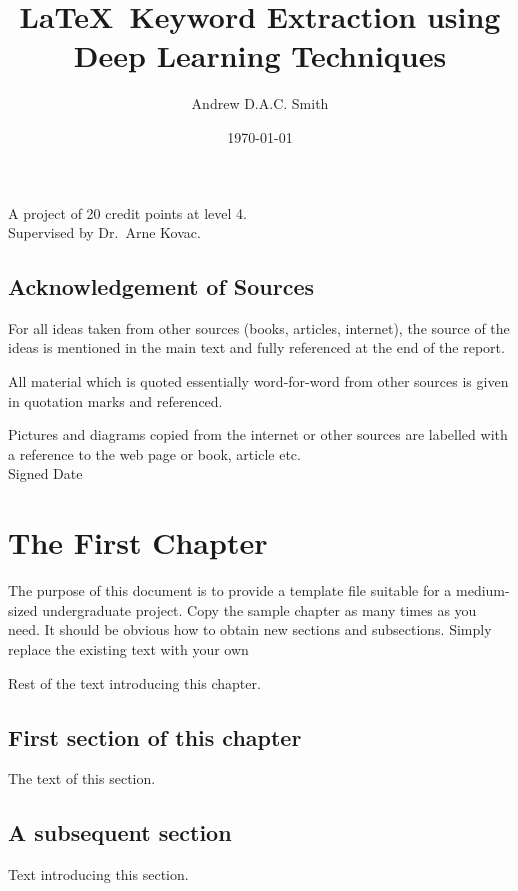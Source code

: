 \documentclass[a4paper, 12pt, notitlepage]{report}
\title{\LaTeX\ Keyword Extraction using Deep Learning Techniques} %
\author{Andrew D.A.C. Smith} %
\date{\today} %
\begin{document}
	
	\maketitle
	\begin{center}
		A project of 20 credit points at level 4. %
		\\[12pt]
		Supervised by Dr.\ Arne Kovac. %
	\end{center}
	\thispagestyle{empty}
	\newpage
	\section*{Acknowledgement of Sources} %
	For all ideas taken from other sources (books, articles, internet), the source of the ideas is mentioned in the main text and fully referenced at the end of the report.
	
	All material which is quoted essentially word-for-word from other sources is given in quotation marks and referenced.
	
	Pictures and diagrams copied from the internet or other sources are labelled with a reference to the web page or book, article etc.
	\\[12pt]
	Signed \dotfill Date \dotfill
	
	\tableofcontents 
	
	
	\chapter{The First Chapter}
	The purpose of this document is to provide a template file suitable for a medium-sized undergraduate project.
	Copy the sample chapter as many times as you need.
	It should be obvious how to obtain new sections and subsections.
	Simply replace the existing text with your own 
	
	Rest of the text introducing this chapter.
	
	\section{First section of this chapter}
	The text of this section.
	
	\section{A subsequent section}
	Text introducing this section.
	
\end{document}
